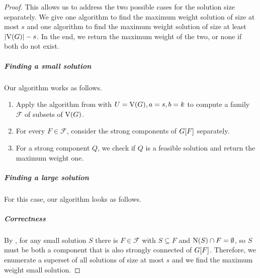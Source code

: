 \begin{theorem}
\begin{lemma}
\begin{theorem}
\begin{proof}
  This allows us to address the two possible cases for the solution size separately. We give one algorithm to find the maximum weight solution of size at most $s$ and one algorithm to find the maximum weight solution of size at least $\abs{\ve{G}} - s$. In the end, we return the maximum weight of the two, or none if both do not exist. 

  \subparagraph*{Finding a small solution} Our algorithm works as follows. 
  \begin{enumerate}
    \item Apply the algorithm from  with $U = \operatorname{V}({G}), a = s, b = k$ to compute a family $\mathcal{F}$ of subsets of $\operatorname{V}({G})$.

    \item For every $F \in \mathcal{F}$, consider the strong components of ${G}[{F}]$ separately.

    \item For a strong component $Q$, we check if $Q$ is a feasible solution and return the maximum weight one.
  \end{enumerate}

  \subparagraph*{Finding a large solution} For this case, our algorithm looks as follows. 

  \subparagraph*{Correctness}
  By , for any small solution $S$ there is $F \in \mathcal{F}$ with $S \subseteq F$ and $\operatorname{N}({S}) \cap F = \emptyset$, so $S$ must be both a component that is also strongly connected of ${G}[{F}]$. Therefore, we enumerate a superset of all solutions of size at most $s$ and we find the maximum weight small solution.


\end{proof}
\end{theorem}
\end{lemma}
\end{theorem}
